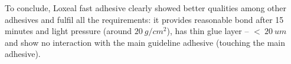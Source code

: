 To conclude, Loxeal fast adhesive clearly showed better qualities among other adhesives and fulfil all the requirements: it provides reasonable bond after 15 minutes and light pressure (around $20~g/cm^{2}$), has thin glue layer -- $<~20~um$ and show no interaction with the main guideline adhesive (touching the main adhesive).
